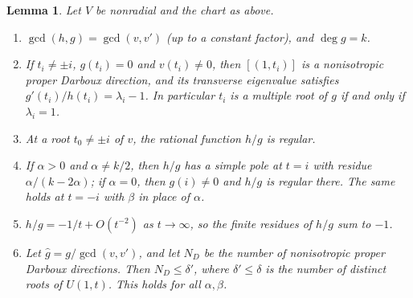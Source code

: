 \documentclass[11pt]{article}
\numberwithin{equation}{section}
\newtheorem{lemma}[theorem]{Lemma}
\theoremstyle{definition}
\theoremstyle{remark}
\begin{document}
\begin{lemma}\label{lem:hg}
Let $V$ be nonradial and the chart as above.
\begin{enumerate}[label=(\alph*)]
\item $\gcd(h,g)=\gcd(v,v')$ (up to a constant factor), and $\deg g=k$.
\item If $t_i\ne\pm i$, $g(t_i)=0$ and $v(t_i)\ne0$, then $[(1,t_i)]$ is a nonisotropic proper Darboux direction, and
its transverse eigenvalue satisfies $g'(t_i)/h(t_i)=\lambda_i-1$. In particular $t_i$ is a multiple root of $g$ if and
only if $\lambda_i=1$.
\item At a root $t_0\ne\pm i$ of $v$, the rational function $h/g$ is regular.
\item If $\alpha>0$ and $\alpha\ne k/2$, then $h/g$ has a simple pole at $t=i$ with residue $\alpha/(k-2\alpha)$; if
$\alpha=0$, then $g(i)\ne0$ and $h/g$ is regular there. The same holds at $t=-i$ with $\beta$ in place of $\alpha$.
\item $h/g=-1/t+O(t^{-2})$ as $t\to\infty$, so the finite residues of $h/g$ sum to $-1$.
\item Let $\hat g=g/\gcd(v,v')$, and let $N_D$ be the number of nonisotropic proper Darboux directions. Then
$N_D\le\delta'$, where $\delta'\le\delta$ is the number of distinct roots of $U(1,t)$. This holds for all $\alpha,\beta$.
\end{enumerate}
\end{lemma}
\end{document}
